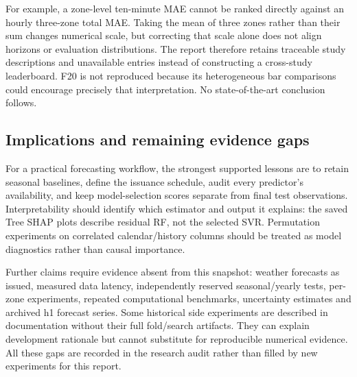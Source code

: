 For example, a zone-level ten-minute MAE cannot be ranked directly against an hourly three-zone total MAE. Taking the mean of three zones rather than their sum changes numerical scale, but correcting that scale alone does not align horizons or evaluation distributions. The report therefore retains traceable study descriptions and unavailable entries instead of constructing a cross-study leaderboard. F20 is not reproduced because its heterogeneous bar comparisons could encourage precisely that interpretation. No state-of-the-art conclusion follows.

\subsection{Implications and remaining evidence gaps}
For a practical forecasting workflow, the strongest supported lessons are to retain seasonal baselines, define the issuance schedule, audit every predictor's availability, and keep model-selection scores separate from final test observations. Interpretability should identify which estimator and output it explains: the saved Tree SHAP plots describe residual RF, not the selected SVR. Permutation experiments on correlated calendar/history columns should be treated as model diagnostics rather than causal importance.

Further claims require evidence absent from this snapshot: weather forecasts as issued, measured data latency, independently reserved seasonal/yearly tests, per-zone experiments, repeated computational benchmarks, uncertainty estimates and archived h1 forecast series. Some historical side experiments are described in documentation without their full fold/search artifacts. They can explain development rationale but cannot substitute for reproducible numerical evidence. All these gaps are recorded in the research audit rather than filled by new experiments for this report.
